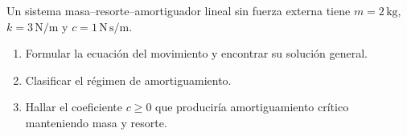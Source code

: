 Un sistema masa--resorte--amortiguador lineal sin fuerza externa tiene \(m=2\,\mathrm{kg}\), \(k=3\,\mathrm{N/m}\) y \(c=1\,\mathrm{N\,s/m}\).

\begin{enumerate}[label=(\alph*),ref=\alph*,leftmargin=*]
\item Formular la ecuación del movimiento y encontrar su solución general.
\item Clasificar el régimen de amortiguamiento.
\item Hallar el coeficiente \(c\ge0\) que produciría amortiguamiento crítico manteniendo masa y resorte.
\end{enumerate}
